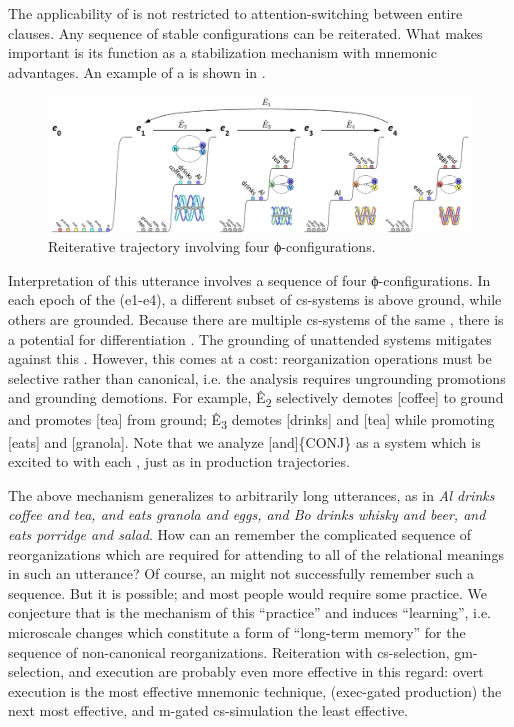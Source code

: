   The applicability of  is not restricted to attention-switching between entire clauses. Any sequence of stable configurations can be reiterated. What makes  important is its function as a stabilization mechanism with mnemonic advantages. An example of a  is shown in {}.  

\z
  
\begin{figure}
\includegraphics[width=\textwidth]{figures/Tilsen-img123.png}
\caption{Reiterative trajectory involving four ϕ-configurations.}
\label{fig:6:4}
\end{figure}
 

  Interpretation of this utterance involves a  sequence of four ϕ-configurations. In each epoch of the  (e1-e4), a different subset of cs-systems is above ground, while others are grounded. Because there are multiple cs-systems of the same , there is a potential for differentiation . The grounding of unattended systems mitigates against this . However, this comes at a cost: reorganization operations must be selective rather than canonical, i.e. the analysis requires ungrounding promotions and grounding demotions. For example, Ê\textsubscript{2} selectively demotes [coffee] to ground and promotes [tea] from ground; Ê\textsubscript{3} demotes [drinks] and [tea] while promoting [eats] and [granola]. Note that we analyze [and]\{CONJ\} as a system which is excited to  with each , just as in production trajectories.

  The above mechanism generalizes to arbitrarily long utterances, as in \textit{Al drinks coffee and tea, and eats granola and eggs, and Bo drinks whisky and beer, and eats porridge and salad}. How can an  remember the complicated sequence of reorganizations which are required for attending to all of the relational meanings in such an utterance? Of course, an  might not successfully remember such a sequence. But it is possible; and most people would require some practice. We conjecture that  is the mechanism of this “practice” and induces “learning”, i.e. microscale changes which constitute a form of “long-term memory” for the sequence of non-canonical reorganizations. Reiteration with cs-selection, gm-selection, and execution are probably even more effective in this regard: overt execution is the most effective mnemonic technique,  (exec-gated production) the next most effective, and m-gated cs-simulation the least effective.

